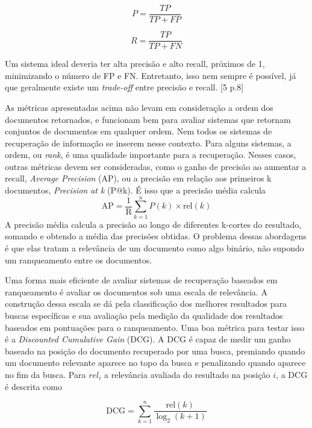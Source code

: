 \documentclass[
	12pt,				%
	openright,			%
	oneside,			%
	a4paper,			%
	english,			%
	french,				%
	spanish,			%
	brazil				%
	]{abntex2}
\begin{document}
$$P = \frac{TP}{TP + FP}$$

$$R = \frac{TP}{TP + FN}$$

Um sistema ideal deveria ter alta precisão e alto recall, próximos de 1, minimizando o número de FP e FN.
Entretanto, isso nem sempre é possível, já que geralmente existe um \textit{trade-off} entre precisão e recall. [5 p.8]

As métricas apresentadas acima não levam em consideração a ordem dos documentos retornados, e funcionam bem para avaliar sistemas que retornam conjuntos de documentos em qualquer ordem.
Nem todos os sistemas de recuperação de informação se inserem nesse contexto.
Para alguns sistemas, a ordem, ou \textit{rank}, é uma qualidade importante para a recuperação.
Nesses casos, outras métricas devem ser consideradas, como o ganho de precisão ao aumentar a recall, \textit{Average Precision} (AP), ou a precisão em relação aos primeiros k documentos, \textit{Precision at k} (P@k).
É isso que a precisão média calcula
$$\text{AP} = \frac{1}{\text{R}} \sum_{k=1}^n P(k) \times \text{rel}(k)$$
A precisão média calcula a precisão ao longo de diferentes k-cortes do resultado, somando e obtendo a média das precisões obtidas.
O problema dessas abordagens é que elas tratam a relevância de um documento como algo binário, não supondo um ranqueamento entre os documentos.

Uma forma mais eficiente de avaliar sistemas de recuperação baseados em ranqueamento é avaliar os documentos sob uma escala de relevância.
A construção dessa escala se dá pela classificação dos melhores resultados para buscas específicas e sua avaliação pela medição da qualidade dos resultados baseados em pontuações para o ranqueamento.
Uma boa métrica para testar isso é a \textit{Discounted Cumulative Gain} (DCG).
A DCG é capaz de medir um ganho baseado na posição do documento recuperado por uma busca, premiando quando um documento relevante aparece no topo da busca e penalizando quando aparece no fim da busca. Para $rel_i$ a relevância avaliada do resultado na posição $i$, a DCG é descrita como

$$\text{DCG} = \sum_{k=1}^n \frac{\text{rel}(k)}{\log_2(k + 1)}$$



%
%
%
%
%
\end{document}
